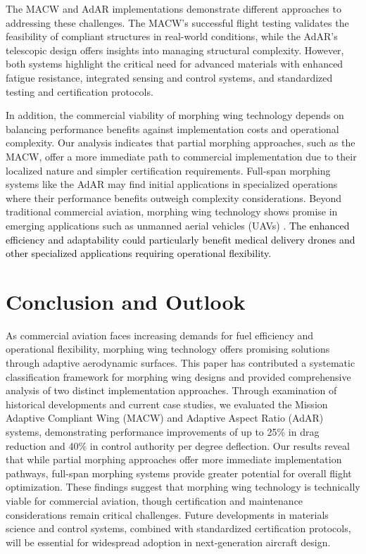 \documentclass[letterpaper, journal, twoside]{IEEEtran}
\newcommand{\revision}[1]{\textcolor{black}{ #1}}
\begin{document}
The MACW and AdAR implementations demonstrate different approaches to addressing these challenges. The MACW's successful flight testing validates the feasibility of compliant structures in real-world conditions, while the AdAR's telescopic design offers insights into managing structural complexity. However, both systems highlight the critical need for advanced materials with enhanced fatigue resistance, integrated sensing and control systems, and standardized testing and certification protocols. 

In addition, the commercial viability of morphing wing technology depends on balancing performance benefits against implementation costs and operational complexity. Our analysis indicates that partial morphing approaches, such as the MACW, offer a more immediate path to commercial implementation due to their localized nature and simpler certification requirements. Full-span morphing systems like the AdAR may find initial applications in specialized operations where their performance benefits outweigh complexity considerations. Beyond traditional commercial aviation, morphing wing technology shows promise in emerging applications such as unmanned aerial vehicles (UAVs) \cite{ling2019aerial}. \revision{The enhanced efficiency and adaptability could particularly benefit medical delivery drones and other specialized applications requiring operational flexibility.}


\section{Conclusion and Outlook}\label{sec:conclusion}

As commercial aviation faces increasing demands for fuel efficiency and operational flexibility, morphing wing technology offers promising solutions through adaptive aerodynamic surfaces. This paper has contributed a systematic classification framework for morphing wing designs and provided comprehensive analysis of two distinct implementation approaches. Through examination of historical developments and current case studies, we evaluated the Mission Adaptive Compliant Wing (MACW) and Adaptive Aspect Ratio (AdAR) systems, demonstrating performance improvements of up to 25\% in drag reduction and 40\% in control authority per degree deflection. Our results reveal that while partial morphing approaches offer more immediate implementation pathways, full-span morphing systems provide greater potential for overall flight optimization. These findings suggest that morphing wing technology is technically viable for commercial aviation, though certification and maintenance considerations remain critical challenges. Future developments in materials science and control systems, combined with standardized certification protocols, will be essential for widespread adoption in next-generation aircraft design.



\end{document}
